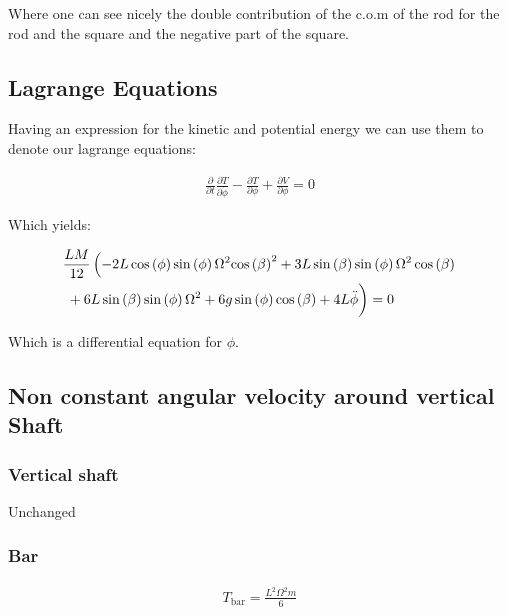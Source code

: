 Where one can see nicely the double contribution of the c.o.m of the rod for the rod and the square and the negative part of the square.


\subsection{Lagrange Equations}
Having an expression for the kinetic and potential energy we can use them to denote our lagrange equations:

\begin{equation}
    \begin{split}
        \frac{\partial}{\partial t}\frac{\partial T}{\partial \dot\phi} - \frac{\partial T}{\partial \phi} + \frac{\partial V}{\partial \phi} = 0
    \end{split}
\end{equation}

Which yields:

\begin{equation}
    \begin{split}
        &\frac{LM}{12}\left(-2L\cos\left(\phi \right)\sin\left(\phi \right)\Omega ^2{\cos\left(\beta \right)}^2+3L\sin\left(\beta \right)\sin\left(\phi \right)\Omega ^2\cos\left(\beta \right)\right.\\
        &\left.\vphantom{\int}+6L\sin\left(\beta \right)\sin\left(\phi \right)\Omega ^2+6g\sin\left(\phi \right)\cos\left(\beta \right)+4L\mathrm{\ddot\phi}\right) = 0
    \end{split}
\end{equation}

Which is a differential equation for $\phi$.

\subsection{Non constant angular velocity around vertical Shaft}
\subsubsection{Vertical shaft}
Unchanged
\subsubsection{Bar}

 \begin{equation}
    \begin{split}
        T_\text{bar} = \frac{L^2\Omega ^2m}{6}
    \end{split}
 \end{equation}

